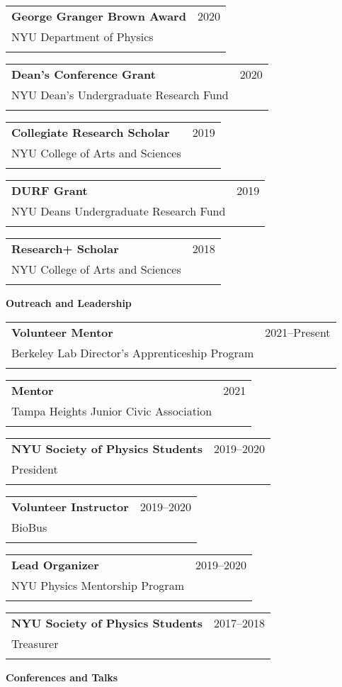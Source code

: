 \documentclass[letterpaper,10pt]{article}
\makeatletter
\newcounter{descounter}
\newcommand{\resetcounter}[0]{\setcounter{descounter}{0}}
\newcommand{\resheading}[1]{\resetcounter \vspace{15pt} {\Large \textbf{#1}} \\ \vspace{-8pt}
    \hrulefill\vspace{5pt}}
\newcommand{\ressubheading}[5]{
    \vspace{10pt}
    \begin{tabular*}{7.0in}{l@{\extracolsep{\fill}}r}
        \textbf{#1} & #2 \\
        #3 & #4 \\
        #5 & \\
    \end{tabular*}\vspace{-5pt}
}
\makeatother
\begin{document}
    \ressubheading{George Granger Brown Award}{2020}{NYU Department of Physics}{}{}{}

    \vspace{-0.15in}
    \ressubheading{Dean's Conference Grant}{2020}{NYU Dean's Undergraduate Research Fund}{}{}{}

    \vspace{-0.15in}
    \ressubheading{Collegiate Research Scholar}{2019}{NYU College of Arts and Sciences}{}{}{}

    \vspace{-0.15in}
    \ressubheading{DURF Grant}{2019}{NYU Deans Undergraduate Research Fund}{}{}{}

    \vspace{-0.15in}
    \ressubheading{Research+ Scholar}{2018}{NYU College of Arts and Sciences}{}{}{}
    \vspace{-0.15in}

\resheading{Outreach and Leadership}

    \ressubheading{Volunteer Mentor}{2021--Present}{Berkeley Lab Director's Apprenticeship Program}{}{}
    \vspace{-0.15in}

    \ressubheading{Mentor}{2021}{Tampa Heights Junior Civic Association}{}{}
    \vspace{-0.15in}

    \ressubheading{NYU Society of Physics Students}{2019--2020}{President}{}{}{}
    \vspace{-0.15in}

    \ressubheading{Volunteer Instructor}{2019--2020}{BioBus}{}{}
    \vspace{-0.15in}

    \ressubheading{Lead Organizer}{2019--2020}{NYU Physics Mentorship Program}{}{}
    \vspace{-0.15in}

    \ressubheading{NYU Society of Physics Students}{2017--2018}{Treasurer}{}{}{}
    \vspace{-0.15in}

\resheading{Conferences and Talks}

\resetcounter
\end{document}
